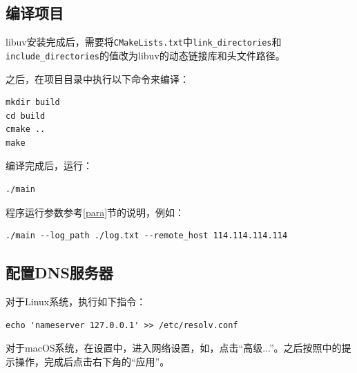 \documentclass[lang=cn,11pt,a4paper,cite=authornum]{paper}
\begin{document}
\subsection{编译项目}

libuv安装完成后，需要将\texttt{CMakeLists.txt}中\texttt{link_directories}和\texttt{include_directories}的值改为libuv的动态链接库和头文件路径。

之后，在项目目录中执行以下命令来编译：

\begin{code}
\begin{verbatim}
mkdir build
cd build
cmake ..
make
\end{verbatim}
\end{code}

编译完成后，运行：

\begin{code}
\begin{verbatim}
./main
\end{verbatim}
\end{code}

程序运行参数参考\ref{para}节的说明，例如：

\begin{code}
\begin{verbatim}
./main --log_path ./log.txt --remote_host 114.114.114.114
\end{verbatim}
\end{code}

\subsection{配置DNS服务器}

对于Linux系统，执行如下指令：

\begin{code}
\begin{verbatim}
echo 'nameserver 127.0.0.1' >> /etc/resolv.conf
\end{verbatim}
\end{code}

对于macOS系统，在设置中，进入网络设置，如，点击“高级...”。之后按照中的提示操作，完成后点击右下角的“应用”。
\end{document}
